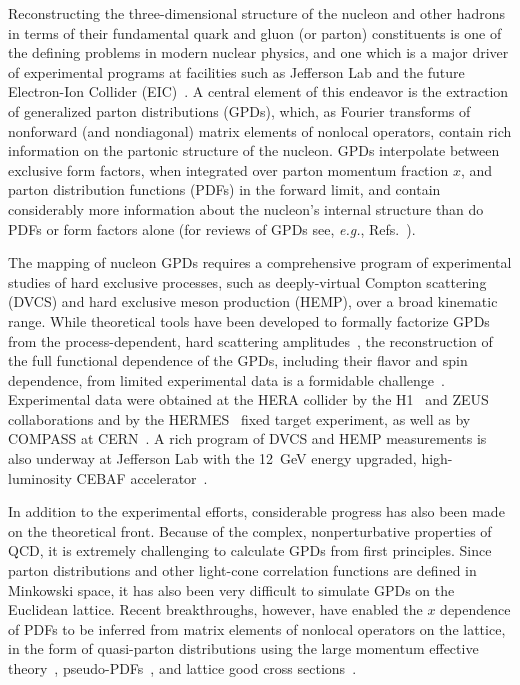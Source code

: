 \documentclass[preprintnumbers,prd,superscriptaddress,preprint]{revtex4-1}
\begin{document}
Reconstructing the three-dimensional structure of the nucleon and other hadrons in terms of their fundamental quark and gluon (or parton) constituents is one of the defining problems in modern nuclear physics, and one which is a major driver of experimental programs at facilities such as Jefferson Lab and the future Electron-Ion Collider (EIC)~\cite{Accardi:2012qut, Avakian:2019csr}.
A central element of this endeavor is the extraction of generalized parton distributions (GPDs), which, as Fourier transforms of nonforward (and nondiagonal) matrix elements of nonlocal operators, contain rich information on the partonic structure of the nucleon.
GPDs interpolate between exclusive form factors, when integrated over parton momentum fraction $x$, and parton distribution functions (PDFs) in the forward limit, and contain considerably more information about the nucleon's internal structure than do PDFs or form factors alone (for reviews of GPDs see, {\it e.g.}, Refs.~\cite{Goeke:2001tz, Belitsky:2005qn}).


The mapping of nucleon GPDs requires a comprehensive program of experimental studies of hard exclusive processes, such as deeply-virtual Compton scattering (DVCS) and hard exclusive meson production (HEMP), over a broad kinematic range.
While theoretical tools have been developed to formally factorize GPDs from the process-dependent, hard scattering amplitudes~\cite{Ji:1998pc, Ji:1996nm, Collins:1998be}, the reconstruction of the full functional dependence of the GPDs, including their flavor and spin dependence, from limited experimental data is a formidable challenge~\cite{Kumericki:2016ehc}.
Experimental data were obtained at the HERA collider by the H1~\cite{Adloff:2001cn, Aktas:2005ty} and ZEUS~\cite{Breitweg:1998nh, Chekanov:2003ya} collaborations and by the HERMES~\cite{Airapetian:2001yk, Airapetian:2011uq, Airapetian:2012mq} fixed target experiment, as well as by COMPASS at CERN~\cite{dHose:2004usi, Fuchey:2015frv}.
A rich program of DVCS and HEMP measurements is also underway at Jefferson Lab with the 12~GeV energy upgraded, high-luminosity CEBAF accelerator~\cite{Stepanyan:2001sm, Defurne:2015kxq, Jo:2015ema, Seder:2014cdc}. 


In addition to the experimental efforts, considerable progress has also been made on the theoretical front.
Because of the complex, nonperturbative properties of QCD, it is extremely challenging to calculate GPDs from first principles.
Since parton distributions and other light-cone correlation functions are defined in Minkowski space, it has also been very difficult to simulate GPDs on the Euclidean lattice.
Recent breakthroughs, however, have enabled the $x$ dependence of PDFs to be inferred from matrix elements of nonlocal operators on the lattice, in the form of quasi-parton distributions using the large momentum effective theory~\cite{Ji:2013dva}, pseudo-PDFs~\cite{Orginos:2017kos}, and lattice good cross sections~\cite{Ma:2014jla, Ma:2017pxb}.
\end{document}
